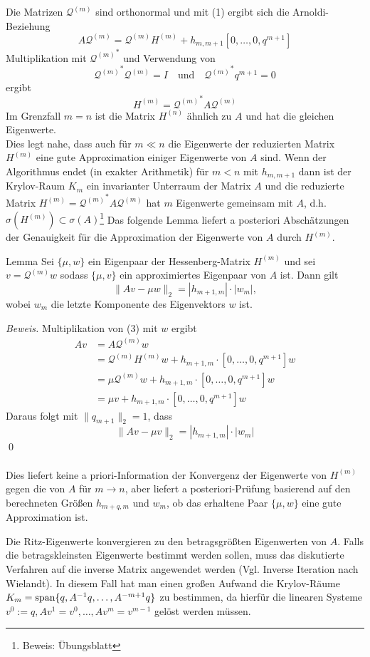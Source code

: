 Die Matrizen $\mathcal{Q}^{(m)}$ sind orthonormal und mit (1) ergibt sich die Arnoldi-Beziehung 
\[A\mathcal{Q}^{(m)} = \mathcal{Q}^{(m)} H^{(m)} + h_{m,m+1}[0,\dotsc,0,q^{m+1}]\tag{3}\]
Multiplikation mit ${\mathcal{Q}^{(m)}}^*$  und Verwendung von 
\[{\mathcal{Q}^{(m)}}^* \mathcal{Q}^{(m)} = I \quad \text{und}\quad {\mathcal{Q}^{(m)}}^* q^{m+1}=0\]
ergibt 
\[H^{(m)} = {\mathcal{Q}^{(m)}}^* A \mathcal{Q}^{(m)}\]
Im Grenzfall $m=n$ ist die Matrix $H^{(n)}$ ähnlich zu $A$ und hat die gleichen Eigenwerte. \\
Dies legt nahe, dass auch für $m\ll n$ die Eigenwerte der reduzierten Matrix $H^{(m)}$ eine gute Approximation 
einiger Eigenwerte von $A$ sind. Wenn der Algorithmus endet (in exakter Arithmetik) für $m<n$ mit $h_{m,m+1}$ dann
ist der Krylov-Raum $K_m$ ein invarianter Unterraum der Matrix $A$ und die reduzierte Matrix $H^{(m)} = 
{\mathcal{Q}^{(m)}}^* A \mathcal{Q}^{(m)}$ hat $m$ Eigenwerte gemeinsam mit $A$, d.h. $\sigma(H^{(m)})\subset \sigma(A)$\footnote{Beweis: Übungsblatt}
Das folgende Lemma liefert a posteriori Abschätzungen der Genauigkeit für die Approximation der Eigenwerte von $A$ durch 
$H^{(m)}$.
\begin{thmbox}{Lemma}
    Sei $\{\mu,w\}$ ein Eigenpaar der Hessenberg-Matrix $H^{(m)}$ und sei $v=\mathcal{Q}^{(m)}w$ sodass $\{\mu,v\}$ ein 
    approximiertes Eigenpaar von $A$ ist. Dann gilt
    \[\|Av-\mu w\|_2 = |h_{m+1,m}|\cdot |w_m|,\] 
    wobei $w_m$ die letzte Komponente des Eigenvektors $w$ ist.
\end{thmbox}
\textit{Beweis.} Multiplikation von (3) mit $w$ ergibt 
\begin{align*}
Av &= A\mathcal{Q}^{(m)}w\\ 
&= \mathcal{Q}^{(m)}H^{(m)}w + h_{m+1,m}\cdot[0,\dotsc,0,q^{m+1}]w \\
&= \mu \mathcal{Q}^{(m)}w + h_{m+1,m}\cdot[0,\dotsc,0,q^{m+1}]w \\
&= \mu v + h_{m+1,m}\cdot[0,\dotsc,0,q^{m+1}]w
\end{align*}
Daraus folgt mit $\|q_{m+1}\|_2 = 1$, dass
\[\|Av-\mu v\|_2 = |h_{m+1,m}|\cdot |w_m|\]
\qed \\ \\
Dies liefert keine a priori-Information der Konvergenz der Eigenwerte von $H^{(m)}$ gegen die von $A$ für $m\to n$, aber
liefert a posteriori-Prüfung basierend auf den berechneten Größen $h_{m+q,m}$ und $w_m$, ob das erhaltene Paar 
$\{\mu,w\}$ eine gute Approximation ist.
\begin{rembox}
    Die Ritz-Eigenwerte konvergieren zu den betragsgrößten Eigenwerten von $A$. Falls die betragskleinsten Eigenwerte 
    bestimmt werden sollen, muss das diskutierte Verfahren auf die inverse Matrix angewendet werden (Vgl. Inverse 
    Iteration nach Wielandt). In diesem Fall hat man einen großen Aufwand die Krylov-Räume 
    $K_m = \text{span}\{q,A^{-1}q,\dotsc,A^{-m+1}q\}$ zu bestimmen, da hierfür die linearen Systeme $v^0:=q, Av^1=v^0, 
    \dotsc, Av^m=v^{m-1}$ gelöst werden müssen.
\end{rembox}